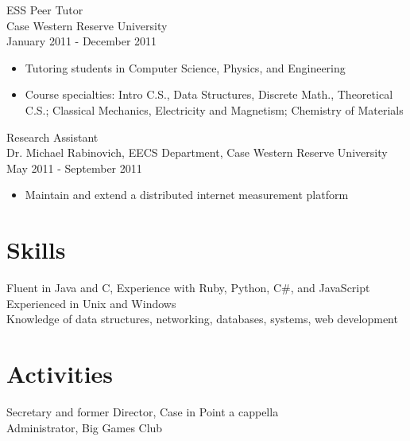 \documentclass{res} %
\begin{document}
\begin{resume}
    ESS Peer Tutor \\
    Case Western Reserve University \\ 
    January 2011 - December 2011
      \begin{itemize} \itemsep -2pt
        \item Tutoring students in Computer Science, Physics, and Engineering
        \item Course specialties: Intro C.S., Data Structures, Discrete Math., Theoretical C.S.; Classical Mechanics, Electricity and Magnetism; Chemistry of Materials
      \end{itemize} 

    Research Assistant \\
    Dr. Michael Rabinovich, EECS Department, Case Western Reserve University \\
    May 2011 - September 2011
      \begin{itemize} \itemsep -2pt
        \item Maintain and extend a distributed internet measurement platform
      \end{itemize}

  \section{Skills}
    Fluent in Java and C, Experience with Ruby, Python, C\#, and JavaScript\\
    Experienced in Unix and Windows \\
    Knowledge of data structures, networking, databases, systems, web development

  \section{Activities} 
    Secretary and former Director, Case in Point a cappella \\
    Administrator, Big Games Club

  \end{resume}
\end{document}
